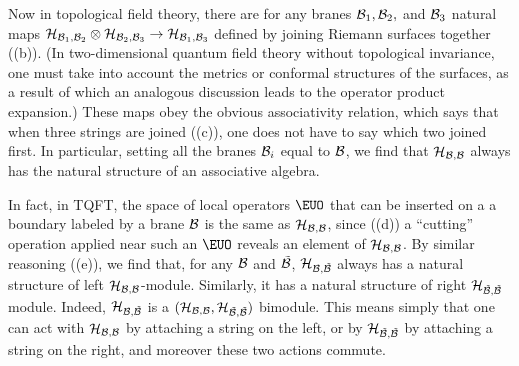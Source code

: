 Now in topological field theory, there are for any branes ${\cal
B}_1,{\cal B}_2,$ and $ {\cal B}_3$ natural maps ${\cal H}_{{\cal
B}_1,{\cal B}_2}\otimes {\cal H}_{{\cal B}_2,{\cal B}_3}\to {\cal
H}_{{\cal B}_1,{\cal B}_3}$ defined by joining Riemann surfaces
together (\dunamp(b)).  (In two-dimensional quantum field theory
without topological invariance, one must take into account the
metrics or conformal structures of the surfaces, as a result of
which an analogous discussion leads to the operator product
expansion.) These maps obey the obvious associativity relation,
which says that when three strings are joined  (\dunamp(c)), one
does not have to say which two joined first. In particular,
setting all the branes ${\cal B}_i$ equal to ${\cal B}$, we find
that ${\cal H}_{{\cal B},{\cal B}}$ always has the natural
structure of an associative algebra.

In fact, in TQFT, the space of local operators ${\EUO}$ that can
be inserted on a a boundary labeled by a brane ${\cal B}$ is the
same as ${\cal H}_{{\cal B},{\cal B}}$, since (\dunamp(d)) a
``cutting'' operation applied near such an ${\EUO}$ reveals an
element of ${\cal H}_{{\cal B},{\cal B}}$. By similar reasoning
(\dunamp(e)), we find that, for any ${\cal B}$ and  $ \tilde{\cal
B}$, ${\cal H}_{{\cal B}, \tilde{\cal B}}$ always has a natural
structure of left ${\cal H}_{{\cal B},{\cal B}}$-module.
Similarly, it has a natural structure of right ${\cal H}_{\tilde
{\cal B},\tilde{\cal B}}$ module. Indeed, ${\cal H}_{{\cal B},
\tilde{\cal B}}$ is a $({\cal H}_{{\cal B},{\cal B}},{\cal
H}_{\tilde{\cal B},\tilde{\cal B}})$ bimodule. This means simply
that one can act with ${\cal H}_{{\cal B},{\cal B}}$ by attaching
a string on the left, or by ${\cal H}_{\tilde{\cal B},\tilde{\cal
B}}$ by attaching a string on the right, and moreover these two
actions commute.
